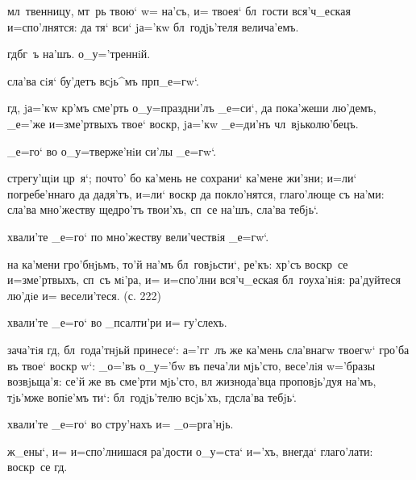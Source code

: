 мл~твенницу, мт~рь твою` w= на'съ, и= твоея` бл~гости 
вся'ч_еская и=спо'лнятся: да тя` вси` jа='кw 
бл~годjь'теля велича'емъ.

гд бг~ъ на'шъ. %
о_у='треннiй.%


сла'ва сiя` бу'детъ всjь^мъ прп _е=гw`.

гд, jа='кw кр'мъ сме'рть о_у=праздни'лъ _е=си`, да 
пока'жеши лю'демъ, _е='же и=з\ъ ме'ртвыхъ твое` 
воскр, jа='кw _е=ди'нъ чл~вjьколю'бецъ.

_е=го` во о_у=тверже'нiи си'лы _е=гw`.

стрегу'щiи цр~я`; почто' бо ка'мень не сохрани` ка'мене 
жи'зни; и=ли` погребе'ннаго да дадя'тъ, и=ли` воскр 
да покло'нятся, глаго'люще съ на'ми: сла'ва мно'жеству 
щедро'тъ твои'хъ, сп~се на'шъ, сла'ва тебjь`. 

хвали'те _е=го` по мно'жеству вели'чествiя _е=гw`.

на ка'мени гро'бнjьмъ, то'й на'мъ бл~говjьсти`, ре'къ: 
хр'съ воскр~се и=з\ъ ме'ртвыхъ, сп~съ мi'ра, и= 
и=спо'лни вся'ч_еская бл~гоуха'нiя: ра'дуйтеся лю'дiе и= 
весели'теся. (с. 222)

хвали'те _е=го` во _псалти'ри и= гу'слехъ.

зача'тiя гд, бл~года'тнjьй принесе`: а='гг~лъ же 
ка'мень сла'внагw твоегw` гро'ба въ твое` воскр 
w`: _о='въ о_у='бw въ печа'ли мjь'сто, весе'лiя 
w='бразы возвjьща'я: се'й же въ сме'рти мjь'сто, вл 
жизнода'вца проповjь'дуя на'мъ, тjь'мже вопiе'мъ ти`: 
бл~годjь'телю всjь'хъ, гд сла'ва тебjь`.


хвали'те _е=го` во стру'нахъ и= _о=рга'нjь.

ж_ены`, и= и=спо'лнишася ра'дости о_у=ста` и='хъ, внегда` 
глаго'лати: воскр~се гд.

